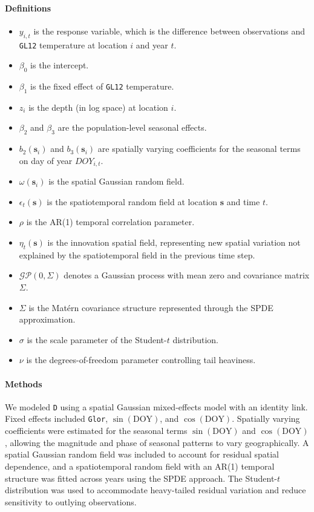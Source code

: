 \documentclass{article}
\begin{document}
\paragraph{Definitions} 
\begin{itemize} 
	\item $y_{i,t}$ is the response variable, which is the difference between observations and \texttt{GL12} temperature at location $i$ and year $t$. 
	\item $\beta_0$ is the intercept. 
	\item $\beta_1$ is the fixed effect of \texttt{GL12} temperature. 
	\item $z_{i}$ is the depth (in log space) at location $i$.
	\item $\beta_2$ and $\beta_3$ are the population-level seasonal effects. 
	\item $b_2(\mathbf{s}_i)$ and $b_3(\mathbf{s}_i)$ are spatially varying coefficients for the seasonal terms on day of year $DOY_{i,t}$. 
	\item $\omega(\mathbf{s}_i)$ is the spatial Gaussian random field. 
	\item $\epsilon_t(\mathbf{s})$ is the spatiotemporal random field at location $\mathbf{s}$ and time $t$. 
	\item $\rho$ is the AR(1) temporal correlation parameter. 
	\item $\eta_t(\mathbf{s})$ is the innovation spatial field, representing new spatial variation not explained by the spatiotemporal field in the previous time step.
	\item $\mathcal{GP}(0,\Sigma)$ denotes a Gaussian process with mean zero and covariance matrix $\Sigma$. 
	\item $\Sigma$ is the Mat\'ern covariance structure represented through the SPDE approximation.
	\item $\sigma$ is the scale parameter of the Student-$t$ distribution. 
	\item $\nu$ is the degrees-of-freedom parameter controlling tail heaviness.
	\end{itemize} 
	\paragraph{Methods}
	 We modeled \texttt{D} using a spatial Gaussian mixed-effects model with an identity link. Fixed effects included \texttt{Glor}, $\sin(\mathrm{DOY})$, and $\cos(\mathrm{DOY})$. Spatially varying coefficients were estimated for the seasonal terms $\sin(\mathrm{DOY})$ and $\cos(\mathrm{DOY})$, allowing the magnitude and phase of seasonal patterns to vary geographically. A spatial Gaussian random field was included to account for residual spatial dependence, and a spatiotemporal random field with an AR(1) temporal structure was fitted across years using the SPDE approach. The Student-$t$ distribution was used to accommodate heavy-tailed residual variation and reduce sensitivity to outlying observations.

 
\end{document}
